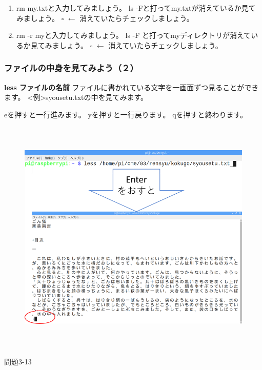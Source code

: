 \documentclass[a4paper,dvipdfmx]{jarticle}
\begin{document}
\begin{enumerate}
\item rm my.txtと入力してみましょう。\newline
ls
{}-Fと打ってmy.txtが消えているか見てみましょう。\newline
${\square}$ $\leftarrow $
消えていたらチェックしましょう。
\item rm {}-r myと入力してみましょう。\newline
ls -F
と打ってmyディレクトリが消えているか見てみましょう。\newline
${\square}$ $\leftarrow $
消えていたらチェックしましょう。
\end{enumerate}
\clearpage\subsubsection{ファイルの中身を見てみよう（２）}
\textbf{less ファイルの名前}\newline
ファイルに書かれている文字を一画面ずつ見ることができます。\newline
{\textless}例{\textgreater}syousetu.txtの中を見てみます。

eを押すと一行進みます。\newline
yを押すと一行戻ります。\newline
qを押すと終わります。

\begin{figure}
\centering
\includegraphics[width=14.242cm,height=11.381cm]{text03-img/text03-img024.png}
\end{figure}
{\ttfamily
問題3-13}
\end{document}
